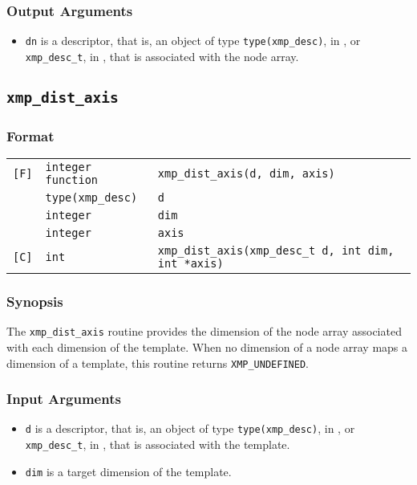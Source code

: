 \subsubsection*{Output Arguments}
\begin{itemize}
 \item {\tt dn} is a descriptor, that is, an object of type 
       {\tt type(xmp\_desc)}, in {\XMPF}, or {\tt xmp\_desc\_t},
       in {\XMPC}, that is associated with the node array.
\end{itemize}


\subsection{\tt xmp\_dist\_axis}

\subsubsection*{Format}

\begin{tabular}{lll}

\verb![F]!& {\tt integer function}& {\tt xmp\_dist\_axis(d, dim, axis)}\\
          & {\tt type(xmp\_desc)} & {\tt d}\\
          & {\tt integer} & {\tt dim}\\
          & {\tt integer} & {\tt axis}\\

\verb![C]!&  {\tt int}& {\tt xmp\_dist\_axis(xmp\_desc\_t d, int dim, int *axis)}\\

\end{tabular}

\subsubsection*{Synopsis}

The {\tt xmp\_dist\_axis} routine provides the dimension of the node array associated with each dimension of the template. When no dimension of a node array maps a dimension of a template, this routine returns {\tt XMP\_UNDEFINED}.


\subsubsection*{Input Arguments}
\begin{itemize}
 \item {\tt d} is a descriptor, that is, an object of type 
       {\tt type(xmp\_desc)}, in {\XMPF}, or {\tt xmp\_desc\_t},
       in {\XMPC}, that is associated with the template.
 \item {\tt dim} is a target dimension of the template.
\end{itemize}

